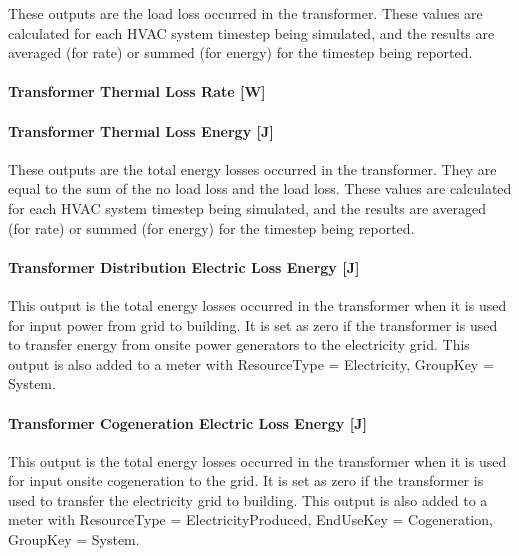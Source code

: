 These outputs are the load loss occurred in the transformer. These values are calculated for each HVAC system timestep being simulated, and the results are averaged (for rate) or summed (for energy) for the timestep being reported.

\paragraph{Transformer Thermal Loss Rate {[}W{]}}\label{transformer-thermal-loss-rate-w}

\paragraph{Transformer Thermal Loss Energy {[}J{]}}\label{transformer-thermal-loss-energy-j}

These outputs are the total energy losses occurred in the transformer. They are equal to the sum of the no load loss and the load loss. These values are calculated for each HVAC system timestep being simulated, and the results are averaged (for rate) or summed (for energy) for the timestep being reported.

\paragraph{Transformer Distribution Electric Loss Energy {[}J{]}}\label{transformer-distribution-electric-loss-energy-j}

This output is the total energy losses occurred in the transformer when it is used for input power from grid to building. It is set as zero if the transformer is used to transfer energy from onsite power generators to the electricity grid. This output is also added to a meter with ResourceType = Electricity, GroupKey = System.

\paragraph{Transformer Cogeneration Electric Loss Energy {[}J{]}}\label{transformer-cogeneration-electric-loss-energy-j}

This output is the total energy losses occurred in the transformer when it is used for input onsite cogeneration to the grid. It is set as zero if the transformer is used to transfer the electricity grid to building. This output is also added to a meter with ResourceType = ElectricityProduced, EndUseKey = Cogeneration, GroupKey = System.

